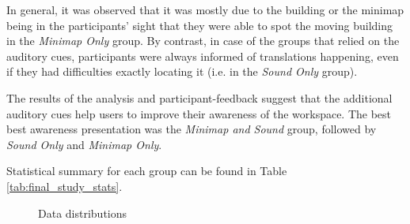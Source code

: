 In general, it was observed that it was mostly due to the building or the minimap being in the participants' sight that they were able to spot the moving building in the \textit{Minimap Only} group. By contrast, in case of the groups that relied on the auditory cues, participants were always informed of translations happening, even if they had difficulties exactly locating it (i.e. in the \textit{Sound Only} group).


The results of the analysis and participant-feedback suggest that the additional auditory cues help users to improve their awareness of the workspace. The best best awareness presentation was the \textit{Minimap and Sound} group, followed by \textit{Sound Only} and \textit{Minimap Only}.

Statistical summary for each group can be found in Table \ref{tab:final_study_stats}.

\begin{figure}
	\centering
	
	

	
	
	\par \smallskip
	
	\caption{Data distributions}
	\label{fig:histograms}
\end{figure}


